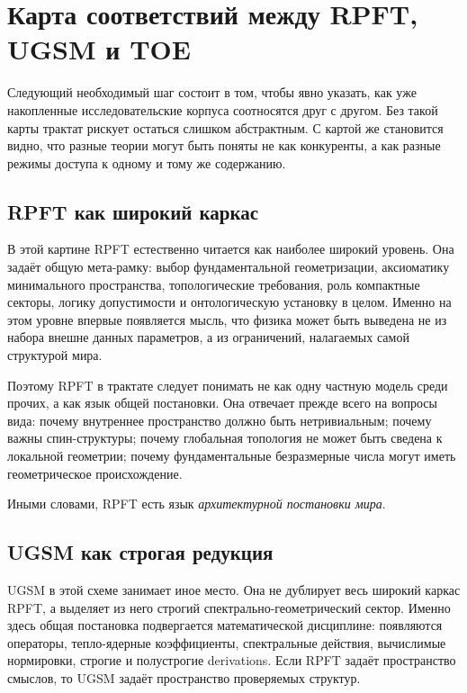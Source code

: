 \documentclass[12pt,a4paper]{article}
\begin{document}
\section{Карта соответствий между RPFT, UGSM и TOE}

Следующий необходимый шаг состоит в том, чтобы явно указать, как уже накопленные исследовательские корпуса соотносятся друг с другом. Без такой карты трактат рискует остаться слишком абстрактным. С картой же становится видно, что разные теории могут быть поняты не как конкуренты, а как разные режимы доступа к одному и тому же содержанию.

\subsection{RPFT как широкий каркас}

В этой картине RPFT естественно читается как наиболее широкий уровень. Она задаёт общую мета-рамку: выбор фундаментальной геометризации, аксиоматику минимального пространства, топологические требования, роль компактные секторы, логику допустимости и онтологическую установку в целом. Именно на этом уровне впервые появляется мысль, что физика может быть выведена не из набора внешне данных параметров, а из ограничений, налагаемых самой структурой мира.

Поэтому RPFT в трактате следует понимать не как одну частную модель среди прочих, а как язык общей постановки. Она отвечает прежде всего на вопросы вида: почему внутреннее пространство должно быть нетривиальным; почему важны спин-структуры; почему глобальная топология не может быть сведена к локальной геометрии; почему фундаментальные безразмерные числа могут иметь геометрическое происхождение.

Иными словами, RPFT есть язык \textit{архитектурной постановки мира}.

\subsection{UGSM как строгая редукция}

UGSM в этой схеме занимает иное место. Она не дублирует весь широкий каркас RPFT, а выделяет из него строгий спектрально-геометрический сектор. Именно здесь общая постановка подвергается математической дисциплине: появляются операторы, тепло-ядерные коэффициенты, спектральные действия, вычислимые нормировки, строгие и полустрогие derivations. Если RPFT задаёт пространство смыслов, то UGSM задаёт пространство проверяемых структур.
\end{document}
